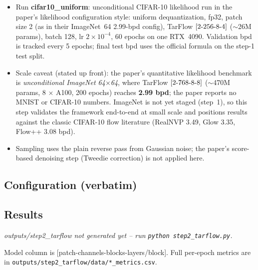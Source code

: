 \documentclass[11pt]{article}
\begin{document}
\begin{itemize}
        256, lr $2\times10^{-3}$, 100 epochs. Deliverables: conditional
        sample grid (one row per digit) and the notebook's Bayes-rule
        classifier evaluation $\arg\min_y \frac12\mathbb{E}[z_y^2] -
        \log|\det|_y$ on the step-1 test split.
  \item Run \textbf{cifar10\_uniform}: unconditional CIFAR-10 likelihood run
        in the paper's likelihood configuration style: uniform
        dequantization, fp32, patch size 2 (as in their ImageNet~64
        2.99-bpd config), TarFlow $[2\hbox{-}256\hbox{-}8\hbox{-}4]$
        ($\sim$26M params), batch 128, lr $2\times10^{-4}$, 60 epochs on one
        RTX~4090. Validation bpd is tracked every 5 epochs; final test bpd
        uses the official formula on the step-1 test split.
  \item Scale caveat (stated up front): the paper's quantitative likelihood
        benchmark is \emph{unconditional ImageNet 64$\times$64}, where
        TarFlow $[2\hbox{-}768\hbox{-}8\hbox{-}8]$ ($\sim$470M params, 8
        $\times$ A100, 200 epochs) reaches \textbf{2.99 bpd}; the paper
        reports no MNIST or CIFAR-10 numbers. ImageNet is not yet staged
        (step~1), so this step validates the framework end-to-end at small
        scale and positions results against the classic CIFAR-10 flow
        literature (RealNVP 3.49, Glow 3.35, Flow++ 3.08 bpd).
  \item Sampling uses the plain reverse pass from Gaussian noise; the
        paper's score-based denoising step (Tweedie correction) is not
        applied here.
\end{itemize}

\subsection{Configuration (verbatim)}
{\small}

\subsection{Results}
\begin{center}
  {\emph{outputs/step2\_tarflow not generated yet -- run
   \texttt{python step2\_tarflow.py}.}}
\end{center}
Model column is [patch-channels-blocks-layers/block]. Full per-epoch metrics
are in \texttt{outputs/step2\_tarflow/data/*\_metrics.csv}.
\end{document}

